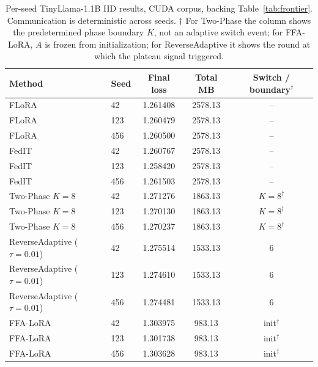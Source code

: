 \begin{table}[t]
\caption{Per-seed TinyLlama-1.1B IID results, CUDA corpus, backing Table~\ref{tab:frontier}. Communication is deterministic across seeds. $\dagger$ For Two-Phase the column shows the predetermined phase boundary $K$, not an adaptive switch event; for FFA-LoRA, $A$ is frozen from initialization; for ReverseAdaptive it shows the round at which the plateau signal triggered.}
\label{tab:b1}
\begin{center}
\small
\setlength{\tabcolsep}{6pt}
\begin{tabular}{llccc}
\toprule
Method & Seed & Final loss & Total MB & Switch / boundary$^\dagger$ \\
\midrule
FLoRA & 42 & 1.261408 & 2578.13 & -- \\
FLoRA & 123 & 1.260479 & 2578.13 & -- \\
FLoRA & 456 & 1.260500 & 2578.13 & -- \\
FedIT & 42 & 1.260767 & 2578.13 & -- \\
FedIT & 123 & 1.258420 & 2578.13 & -- \\
FedIT & 456 & 1.261503 & 2578.13 & -- \\
Two-Phase $K{=}8$ & 42 & 1.271276 & 1863.13 & $K{=}8^\dagger$ \\
Two-Phase $K{=}8$ & 123 & 1.270130 & 1863.13 & $K{=}8^\dagger$ \\
Two-Phase $K{=}8$ & 456 & 1.270237 & 1863.13 & $K{=}8^\dagger$ \\
ReverseAdaptive ($\tau{=}0.01$) & 42 & 1.275514 & 1533.13 & 6 \\
ReverseAdaptive ($\tau{=}0.01$) & 123 & 1.274610 & 1533.13 & 6 \\
ReverseAdaptive ($\tau{=}0.01$) & 456 & 1.274481 & 1533.13 & 6 \\
FFA-LoRA & 42 & 1.303975 & \phantom{0}983.13 & init$^\dagger$ \\
FFA-LoRA & 123 & 1.301738 & \phantom{0}983.13 & init$^\dagger$ \\
FFA-LoRA & 456 & 1.303628 & \phantom{0}983.13 & init$^\dagger$ \\
\bottomrule
\end{tabular}
\end{center}
\end{table}

